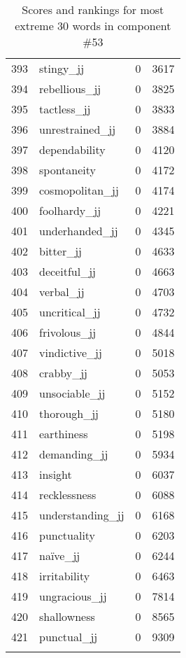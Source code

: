 \begin{longtable}[!htbp]{| rlr@{.}l |}
    393 & stingy\_jj & 0 & 3617 \\
    394 & rebellious\_jj & 0 & 3825 \\
    395 & tactless\_jj & 0 & 3833 \\
    396 & unrestrained\_jj & 0 & 3884 \\
    397 & dependability & 0 & 4120 \\
    398 & spontaneity & 0 & 4172 \\
    399 & cosmopolitan\_jj & 0 & 4174 \\
    400 & foolhardy\_jj & 0 & 4221 \\
    401 & underhanded\_jj & 0 & 4345 \\
    402 & bitter\_jj & 0 & 4633 \\
    403 & deceitful\_jj & 0 & 4663 \\
    404 & verbal\_jj & 0 & 4703 \\
    405 & uncritical\_jj & 0 & 4732 \\
    406 & frivolous\_jj & 0 & 4844 \\
    407 & vindictive\_jj & 0 & 5018 \\
    408 & crabby\_jj & 0 & 5053 \\
    409 & unsociable\_jj & 0 & 5152 \\
    410 & thorough\_jj & 0 & 5180 \\
    411 & earthiness & 0 & 5198 \\
    412 & demanding\_jj & 0 & 5934 \\
    413 & insight & 0 & 6037 \\
    414 & recklessness & 0 & 6088 \\
    415 & understanding\_jj & 0 & 6168 \\
    416 & punctuality & 0 & 6203 \\
    417 & naïve\_jj & 0 & 6244 \\
    418 & irritability & 0 & 6463 \\
    419 & ungracious\_jj & 0 & 7814 \\
    420 & shallowness & 0 & 8565 \\
    421 & punctual\_jj & 0 & 9309 \\
    \hline
    \caption{Scores and rankings for most extreme 30 words in component \#53} \\
\end{longtable}
